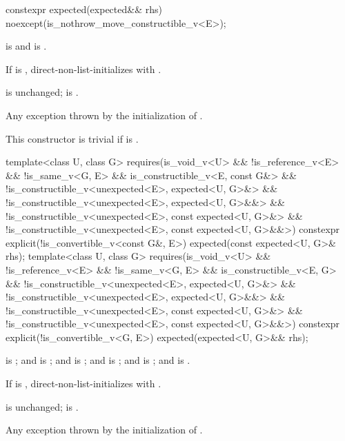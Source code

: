 %
\begin{itemdecl}
constexpr expected(expected&& rhs) noexcept(is_nothrow_move_constructible_v<E>);
\end{itemdecl}

\begin{itemdescr}
\pnum
\constraints
{} is  and  is .

\pnum
\effects
If  is , direct-non-list-initializes  with .

\pnum
\ensures
{} is unchanged;  is .

\pnum
\throws
Any exception thrown by the initialization of .

\pnum
\remarks
This constructor is trivial if  is .
\end{itemdescr}

%
\begin{itemdecl}
template<class U, class G>
  requires(is_void_v<U> && !is_reference_v<E> && !is_same_v<G, E> &&
           is_constructible_v<E, const G&> &&
           !is_constructible_v<unexpected<E>, expected<U, G>&> &&
           !is_constructible_v<unexpected<E>, expected<U, G>&&> &&
           !is_constructible_v<unexpected<E>, const expected<U, G>&> &&
           !is_constructible_v<unexpected<E>, const expected<U, G>&&>)
constexpr explicit(!is_convertible_v<const G&, E>) expected(const expected<U, G>& rhs);
template<class U, class G>
  requires(is_void_v<U> && !is_reference_v<E> && !is_same_v<G, E> &&
           is_constructible_v<E, G> &&
           !is_constructible_v<unexpected<E>, expected<U, G>&> &&
           !is_constructible_v<unexpected<E>, expected<U, G>&&> &&
           !is_constructible_v<unexpected<E>, const expected<U, G>&> &&
           !is_constructible_v<unexpected<E>, const expected<U, G>&&>)
constexpr explicit(!is_convertible_v<G, E>) expected(expected<U, G>&& rhs);
\end{itemdecl}

\begin{itemdescr}
\pnum
\constraints
{} is ; and  is ; and  is ; and  is ; and  is ; and  is .

\pnum
\effects
If  is , direct-non-list-initializes  with .

\pnum
\ensures
{} is unchanged;  is .

\pnum
\throws
Any exception thrown by the initialization of .
\end{itemdescr}


